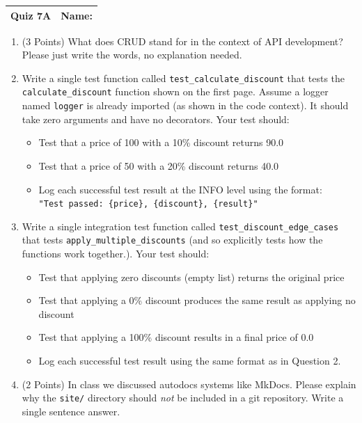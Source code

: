 \documentclass[11pt]{article}
\begin{document}
\clearpage

\begin{tabularx}{\textwidth}{l|X}
\textbf{Quiz 7A} &   \textbf{Name: } \\
\hline
\end{tabularx}


\begin{enumerate}

\item (3 Points) What does CRUD stand for in the context of API development? Please just write the words, no explanation needed.
\vspace{1.5cm}


\item Write a single test function called \texttt{test\_calculate\_discount} that tests the \texttt{calculate\_discount} function shown on the first page. Assume a logger named \texttt{logger} is already imported (as shown in the code context). It should take zero arguments and have no decorators. Your test should:
\begin{itemize}
    \item Test that a price of 100 with a 10\% discount returns 90.0
    \item Test that a price of 50 with a 20\% discount returns 40.0
    \item Log each successful test result at the INFO level using the format: \\ \texttt{"Test passed: \{price\}, \{discount\}, \{result\}"}
\end{itemize}

\vspace{5.5cm}
	


\item Write a single integration test function called \texttt{test\_discount\_edge\_cases} that tests \texttt{apply\_multiple\_discounts} (and so explicitly tests how  the functions work together.). Your test should:
\begin{itemize}
    \item Test that applying zero discounts (empty list) returns the original price
    \item Test that applying a 0\% discount produces the same result as applying no discount
    \item Test that applying a 100\% discount results in a final price of 0.0
    \item Log each successful test result using the same format as in Question 2.
\end{itemize}

\vspace{6.5cm}

\item (2 Points) In class we discussed autodocs systems like MkDocs. Please explain why the \texttt{site/} directory should {\it not} be included in a git repository. Write a single sentence answer.


\end{enumerate}
\end{document}
